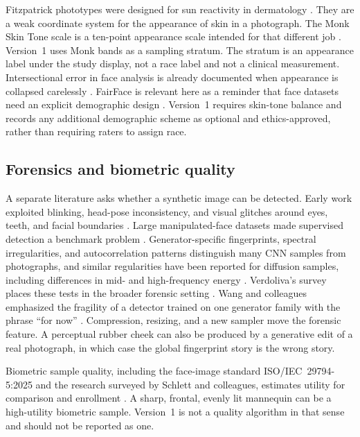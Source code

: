 \documentclass[10pt,twocolumn]{article}
\begin{document}
Fitzpatrick phototypes were designed for sun reactivity in dermatology \cite{fitzpatrick1988}. They are a weak coordinate system for the appearance of skin in a photograph. The Monk Skin Tone scale is a ten-point appearance scale intended for that different job \cite{monk2019}. Version~1 uses Monk bands as a sampling stratum. The stratum is an appearance label under the study display, not a race label and not a clinical measurement. Intersectional error in face analysis is already documented when appearance is collapsed carelessly \cite{buolamwini2018}. FairFace is relevant here as a reminder that face datasets need an explicit demographic design \cite{karkkainen2021fairface}. Version~1 requires skin-tone balance and records any additional demographic scheme as optional and ethics-approved, rather than requiring raters to assign race.

\subsection{Forensics and biometric quality}

A separate literature asks whether a synthetic image can be detected. Early work exploited blinking, head-pose inconsistency, and visual glitches around eyes, teeth, and facial boundaries \cite{matern2019}. Large manipulated-face datasets made supervised detection a benchmark problem \cite{rossler2019}. Generator-specific fingerprints, spectral irregularities, and autocorrelation patterns distinguish many CNN samples from photographs, and similar regularities have been reported for diffusion samples, including differences in mid- and high-frequency energy \cite{yu2019fingerprint,durall2020upconv,frank2020freq,wang2020cnn,corvi2023icassp,corvi2023cvprw}. Verdoliva's survey places these tests in the broader forensic setting \cite{verdoliva2020}. Wang and colleagues emphasized the fragility of a detector trained on one generator family with the phrase ``for now'' \cite{wang2020cnn}. Compression, resizing, and a new sampler move the forensic feature. A perceptual rubber cheek can also be produced by a generative edit of a real photograph, in which case the global fingerprint story is the wrong story.

Biometric sample quality, including the face-image standard ISO/IEC~29794-5:2025 and the research surveyed by Schlett and colleagues, estimates utility for comparison and enrollment \cite{iso29794,schlett2022,terhorst2020serfiq}. A sharp, frontal, evenly lit mannequin can be a high-utility biometric sample. Version~1 is not a quality algorithm in that sense and should not be reported as one.
\end{document}
